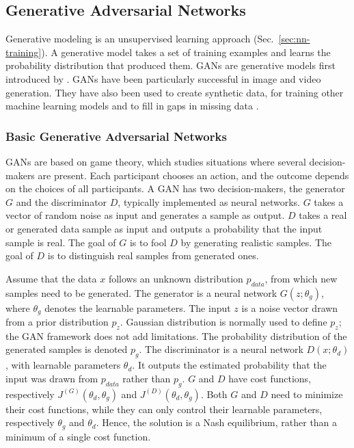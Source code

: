 \subsection{Generative Adversarial Networks}
Generative modeling is an unsupervised learning approach (Sec.~\ref{sec:nn-training}). A generative model takes a set of training examples and learns the probability distribution that produced them. GANs are generative models first introduced by \textcite{goodfellowGenerativeAdversarialNetworks2014}.
GANs have been particularly successful in image and video generation. They have also been used to create synthetic data, for training other machine learning models and to fill in gaps in missing data \parencite{goodfellowGenerativeAdversarialNetworks2020}.

\subsubsection{Basic Generative Adversarial Networks}\label{sec:basic-gan}

GANs are based on game theory, which studies situations where several decision-makers are present. Each participant chooses an action, and the outcome depends on the choices of all participants. A GAN has two decision-makers, the generator $G$ and the discriminator $D$, typically implemented as neural networks. $G$ takes a vector of random noise as input and generates a sample as output. $D$ takes a real or generated data sample as input and outputs a probability that the input sample is real. The goal of $G$ is to fool $D$ by generating realistic samples. The goal of $D$ is to distinguish real samples from generated ones.

Assume that the data $x$ follows an unknown distribution $p_{data}$, from which new samples need to be generated. The generator is a neural network $G(z; \theta_g)$, where $\theta_g$ denotes the learnable parameters. The input $z$ is a noise vector drawn from a prior distribution $p_z$. Gaussian distribution is normally used to define $p_z$; the GAN framework does not add limitations. The probability distribution of the generated samples is denoted $p_g$. The discriminator is a neural network $D(x; \theta_d)$, with learnable parameters $\theta_d$. It outputs the estimated probability that the input was drawn from  $p_{data}$ rather than $p_{g}$. $G$ and $D$ have cost functions, respectively $J^{(G)}(\theta_d, \theta_g)$ and $J^{(D)}(\theta_d, \theta_g)$. Both $G$ and $D$ need to minimize their cost functions, while they can only control their learnable parameters, respectively $\theta_g$ and $\theta_d$. Hence, the solution is a Nash equilibrium, rather than a minimum of a single cost function.

